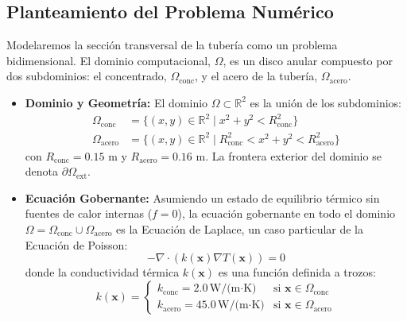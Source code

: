 \subsection{Planteamiento del Problema Numérico}
Modelaremos la sección transversal de la tubería como un problema bidimensional. El dominio computacional, \(\Omega\), es un disco anular compuesto por dos subdominios: el concentrado, \(\Omega_{\text{conc}}\), y el acero de la tubería, \(\Omega_{\text{acero}}\).

\begin{itemize}
    \item \textbf{Dominio y Geometría:} El dominio \(\Omega \subset \mathbb{R}^2\) es la unión de los subdominios:
    \begin{align*}
        \Omega_{\text{conc}} &= \{ (x,y) \in \mathbb{R}^2 \mid x^2 + y^2 < R_{\text{conc}}^2 \} \\
        \Omega_{\text{acero}} &= \{ (x,y) \in \mathbb{R}^2 \mid R_{\text{conc}}^2 < x^2 + y^2 < R_{\text{acero}}^2 \}
    \end{align*}
    con \(R_{\text{conc}} = 0.15\) m y \(R_{\text{acero}} = 0.16\) m. La frontera exterior del dominio se denota \(\partial\Omega_{\text{ext}}\).
    
    \item \textbf{Ecuación Gobernante:} Asumiendo un estado de equilibrio térmico sin fuentes de calor internas (\(f=0\)), la ecuación gobernante en todo el dominio \(\Omega = \Omega_{\text{conc}} \cup \Omega_{\text{acero}}\) es la Ecuación de Laplace, un caso particular de la Ecuación de Poisson:
    \[ -\nabla \cdot (k(\bm{x}) \nabla T(\bm{x})) = 0 \]
    donde la conductividad térmica \(k(\bm{x})\) es una función definida a trozos:
    \[
    k(\bm{x}) = 
    \begin{cases} 
    k_{\text{conc}} = 2.0 \, \text{W/(m·K)} & \text{si } \bm{x} \in \Omega_{\text{conc}} \\
    k_{\text{acero}} = 45.0 \, \text{W/(m·K)} & \text{si } \bm{x} \in \Omega_{\text{acero}} 
    \end{cases}
    \]
    

\end{itemize}
